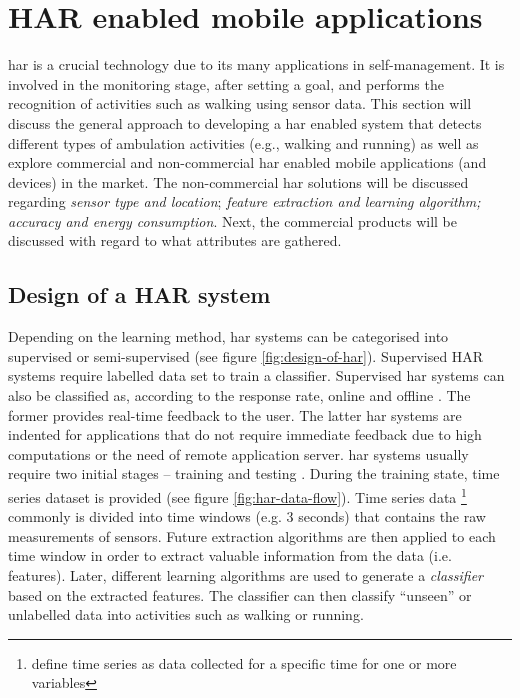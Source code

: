 \section{HAR enabled mobile applications}
\gls{har} is a crucial technology due to its many applications in self-management. It is involved in the monitoring stage, after setting a goal, and performs the recognition of activities such as walking using sensor data. This section will discuss the general approach to developing a \gls{har} enabled system that detects different types of ambulation activities (e.g., walking and running) as well as explore commercial and non-commercial \gls{har} enabled mobile applications (and devices) in the market. The non-commercial \gls{har} solutions will be discussed regarding \textit{sensor type and location}; \textit{feature extraction and learning algorithm; accuracy and energy consumption}. Next, the commercial products will be discussed with regard to what attributes are gathered.

    \subsection{Design of a HAR system}
    Depending on the learning method, \gls{har} systems can be categorised into supervised or semi-supervised (see figure \ref{fig:design-of-har}). Supervised HAR systems require labelled data set to train a classifier. Supervised \gls{har} systems can also be classified as, according to the response rate, online and offline \citep[29]{labrador2013}. The former provides real-time feedback to the user. The latter \gls{har} systems are indented for applications that do not require immediate feedback due to high computations or the need of remote application server. \gls{har} systems usually require two initial stages – training and testing \citep[4]{labrador2013}. During the training state, time series dataset is provided (see figure \ref{fig:har-data-flow}). Time series data \footnote{ \citet{torresreyna2012} define time series as data collected for a specific time for one or more variables}  commonly is divided into time windows (e.g. 3 seconds) that contains the raw measurements of sensors. Future extraction algorithms are then applied to each time window in order to extract valuable information from the data (i.e. features). Later, different learning algorithms are used to generate a \textit{classifier} based on the extracted features. The classifier can then classify “unseen” or unlabelled data into activities such as walking or running. 
    
